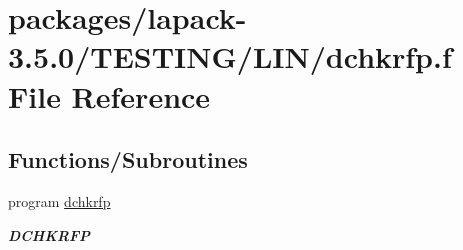 \hypertarget{dchkrfp_8f}{}\section{packages/lapack-\/3.5.0/\+T\+E\+S\+T\+I\+N\+G/\+L\+I\+N/dchkrfp.f File Reference}
\label{dchkrfp_8f}
\subsection*{Functions/\+Subroutines}
\begin{DoxyCompactItemize}
\item 
program \hyperlink{group__double__lin_ga6dc9e833fd37f2fd47c903496ae4fb7d}{dchkrfp}
\begin{DoxyCompactList}\small\item\em {\bfseries D\+C\+H\+K\+R\+F\+P} \end{DoxyCompactList}\end{DoxyCompactItemize}
